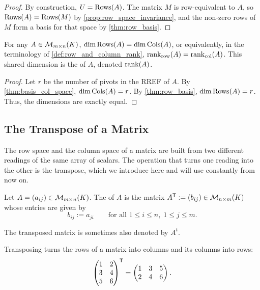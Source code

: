 \begin{proof}
By construction, $U = \operatorname{Rows}(A)$. The matrix $M$ is row-equivalent to $A$, so $\operatorname{Rows}(A) = \operatorname{Rows}(M)$ by \cref{prop:row_space_invariance}, and the non-zero rows of $M$ form a basis for that space by \cref{thm:row_basis}.
\end{proof}

\begin{theorem}
\label{thm:rank_equality}
For any $A \in \mathcal{M}_{m \times n}(K)$, $\dim \operatorname{Rows}(A) = \dim \operatorname{Cols}(A)$, or equivalently, in the terminology of \cref{def:row_and_column_rank}, $\operatorname{rank}_{\text{row}}(A) = \operatorname{rank}_{\text{col}}(A)$. This shared dimension is the  of $A$, denoted $\operatorname{rank}(A)$.
\end{theorem}
\begin{proof}
Let $r$ be the number of pivots in the RREF of $A$. By \cref{thm:basis_col_space}, $\dim \operatorname{Cols}(A) = r$. By \cref{thm:row_basis}, $\dim \operatorname{Rows}(A) = r$. Thus, the dimensions are exactly equal.
\end{proof}

\subsection{The Transpose of a Matrix}

The row space and the column space of a matrix are built from two different readings of the same array of scalars. The operation that turns one reading into the other is the transpose, which we introduce here and will use constantly from now on.

\begin{definition}
\label{def:transpose}
Let $A = (a_{ij}) \in \mathcal{M}_{m \times n}(K)$. The  of $A$ is the matrix $A^{\mathsf{T}} := (b_{ij}) \in \mathcal{M}_{n \times m}(K)$ whose entries are given by
\[
b_{ij} := a_{ji} \qquad \text{for all } 1 \le i \le n, \; 1 \le j \le m.
\]
\end{definition}

\begin{notation}
The transposed matrix is sometimes also denoted by $A^{t}$.
\end{notation}

\begin{example}
\label{ex:transpose_computation}
Transposing turns the rows of a matrix into columns and its columns into rows:
\[
\begin{pmatrix} 1 & 2 \\ 3 & 4 \\ 5 & 6 \end{pmatrix}^{\mathsf{T}} = \begin{pmatrix} 1 & 3 & 5 \\ 2 & 4 & 6 \end{pmatrix}.
\]
\end{example}

